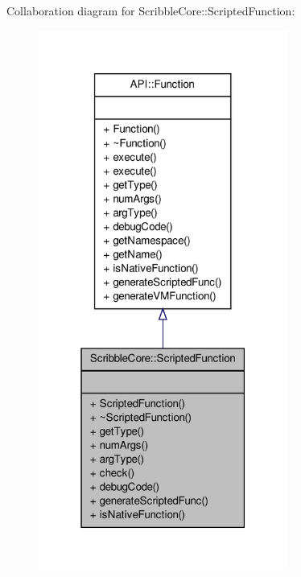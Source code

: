 Collaboration diagram for Scribble\-Core\-:\-:Scripted\-Function\-:
\nopagebreak
\begin{figure}[H]
\begin{center}
\leavevmode
\includegraphics[width=232pt]{class_scribble_core_1_1_scripted_function__coll__graph}
\end{center}
\end{figure}
